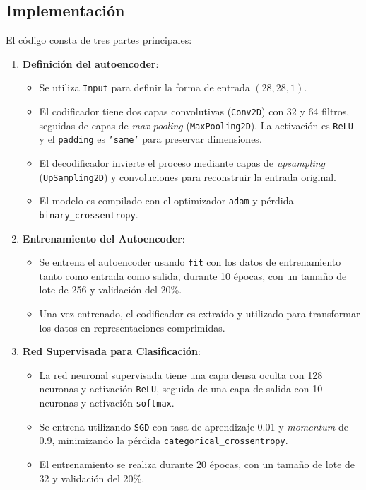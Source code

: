 \subsection{Implementación}

El código consta de tres partes principales:
\begin{enumerate}
	\item \textbf{Definición del autoencoder}:
	\begin{itemize}
		\item Se utiliza \texttt{Input} para definir la forma de entrada $(28, 28, 1)$.
		\item El codificador tiene dos capas convolutivas (\texttt{Conv2D}) con 32 y 64 filtros, seguidas de capas de \textit{max-pooling} (\texttt{MaxPooling2D}). La activación es \texttt{ReLU} y el \texttt{padding} es \texttt{'same'} para preservar dimensiones.
		\item El decodificador invierte el proceso mediante capas de \textit{upsampling} (\texttt{UpSampling2D}) y convoluciones para reconstruir la entrada original.
		\item El modelo es compilado con el optimizador \texttt{adam} y pérdida \texttt{binary\_crossentropy}.
	\end{itemize}
	
	\item \textbf{Entrenamiento del Autoencoder}:
	\begin{itemize}
		\item Se entrena el autoencoder usando \texttt{fit} con los datos de entrenamiento tanto como entrada como salida, durante 10 épocas, con un tamaño de lote de 256 y validación del 20\%.
		\item Una vez entrenado, el codificador es extraído y utilizado para transformar los datos en representaciones comprimidas.
	\end{itemize}
	
	\item \textbf{Red Supervisada para Clasificación}:
	\begin{itemize}
		\item La red neuronal supervisada tiene una capa densa oculta con 128 neuronas y activación \texttt{ReLU}, seguida de una capa de salida con 10 neuronas y activación \texttt{softmax}.
		\item Se entrena utilizando \texttt{SGD} con tasa de aprendizaje 0.01 y \textit{momentum} de 0.9, minimizando la pérdida \texttt{categorical\_crossentropy}.
		\item El entrenamiento se realiza durante 20 épocas, con un tamaño de lote de 32 y validación del 20\%.
	\end{itemize}
\end{enumerate}

